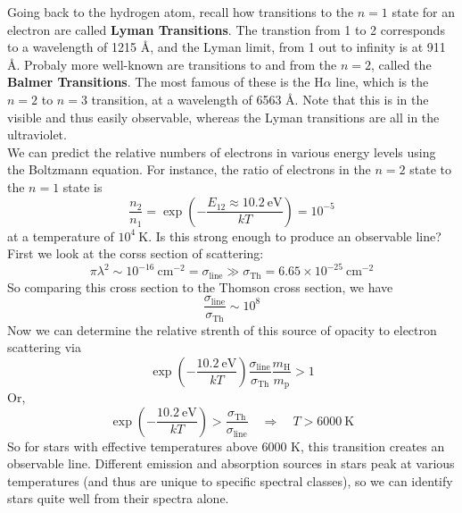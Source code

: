 \documentclass[10pt]{article}
\numberwithin{equation}{section}
\newcommand{\n}{\noindent}
\begin{document}
    \n Going back to the hydrogen atom, recall how transitions to the
    $n=1$ state for an electron are called \textbf{Lyman
      Transitions}. The transtion from 1 to 2 corresponds to a
    wavelength of 1215 \AA, and the Lyman limit, from 1 out to infinity
    is at 911 \AA. Probaly more well-known are transitions to and from the
    $n=2$, called the \textbf{Balmer Transitions}. The most famous of
    these is the H$\alpha$ line, which is the $n=2$ to $n=3$
    transition, at a wavelength of 6563 \AA. Note that this is in the
    visible and thus easily observable, whereas the Lyman transitions
    are all in the ultraviolet.\\

    \n We can predict the relative numbers of electrons in various
    energy levels using the Boltzmann equation. For instance, the
    ratio of electrons in the $n=2$ state to the $n=1$ state is 
    \begin{equation}
      \label{eq:217}
      \frac{n_2}{n_1}=\exp\left(-\frac{E_{12}\approx 10.2\ \mathrm{eV}}{kT}\right)=10^{-5}
    \end{equation}
    at a temperature of $10^4\ \mathrm{K}$. Is this strong enough to
    produce an observable line? First we look at the corss section of
    scattering:
    \begin{equation}
      \label{eq:218}
      \pi\lambda^2\sim 10^{-16}\ \mathrm{cm^{-2}}=\sigma_{\mathrm{line}}\gg \sigma_{\mathrm{Th}}=6.65\times
      10^{-25}\ \mathrm{cm^{-2}}
    \end{equation}
    So comparing this cross section to the Thomson cross section, we
    have
    \begin{equation}
      \label{eq:219}
      \frac{\sigma_{\mathrm{line}}}{\sigma_{\mathrm{Th}}}\sim 10^8
    \end{equation}
    Now we can determine the relative strenth of this source of
    opacity to electron scattering via
    \begin{equation}
      \label{eq:220}
      \exp\left(-\frac{10.2\
          \mathrm{eV}}{kT}\right)\frac{\sigma_{\mathrm{line}}}{\sigma_{\mathrm{Th}}}\frac{m_\mathrm{H}}{m_{\mathrm{p}}}>1
    \end{equation}
    Or,
    \begin{equation}
      \label{eq:221}
      \exp\left(-\frac{10.2\
          \mathrm{eV}}{kT}\right)>\frac{\sigma_{\mathrm{Th}}}{\sigma_{\mathrm{line}}}\quad\Rightarrow\quad
      T>6000\ \mathrm{K}
    \end{equation}
    So for stars with effective temperatures above 6000 K, this
    transition creates an observable line. Different emission and
    absorption sources in stars peak at various temperatures (and thus
    are unique to specific spectral classes), so we can identify stars
    quite well from their spectra alone.
\end{document}
